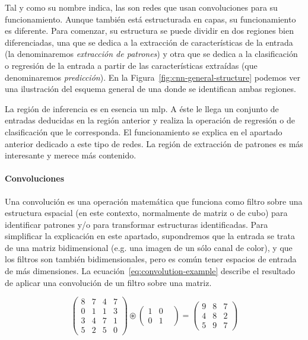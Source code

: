 Tal y como su nombre indica, las  son redes que usan convoluciones para su funcionamiento. Aunque también está estructurada en capas, su funcionamiento es diferente. Para comenzar, su estructura se puede dividir en dos regiones bien diferenciadas, una que se dedica a la extracción de características de la entrada (la denominaremos \textit{extracción de patrones}) y otra que se dedica a la clasificación o regresión de la entrada a partir de las características extraídas (que denominaremos \textit{predicción}). En la Figura~\ref{fig:cnn-general-structure} podemos ver una ilustración del esquema general de una  donde se identifican ambas regiones.

La región de inferencia es en esencia un \ac{mlp}. A éste le llega un conjunto de entradas deducidas en la región anterior y realiza la operación de regresión o de clasificación que le corresponda. El funcionamiento se explica en el apartado anterior dedicado a este tipo de redes. La región de extracción de patrones es más interesante y merece más contenido.

\paragraph{Convoluciones}

Una convolución es una operación matemática que funciona como filtro sobre una estructura espacial (en este contexto, normalmente de matriz o de cubo) para identificar patrones y/o para transformar estructuras identificadas. Para simplificar la explicación en este apartado, supondremos que la entrada se trata de una matriz bidimensional (e.g. una imagen de un sólo canal de color), y que los filtros son también bidimensionales, pero es común tener espacios de entrada de más dimensiones. La ecuación~\ref{eq:convolution-example} describe el resultado de aplicar una convolución de un filtro sobre una matriz.

\begin{equation*}
	\begin{pmatrix}
		8 & 7 & 4 & 7  \\
		0 & 1 & 1 & 3  \\
		3 & 4 & 7 & 1  \\
		5 & 2 & 5 & 0
	\end{pmatrix}
	\circledast
	\begin{pmatrix}
		1 & 0 &  \\
		0 & 1
	\end{pmatrix}
	=
	\begin{pmatrix}
		9 & 8 & 7  \\
		4 & 8 & 2  \\
		5 & 9 & 7
	\end{pmatrix}
	\label{eq:convolution-example}
\end{equation*}

